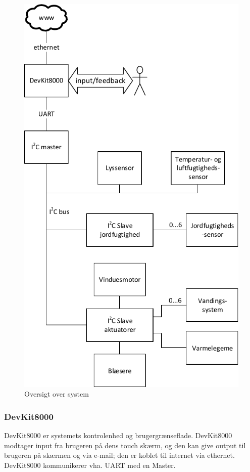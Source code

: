 \begin{figure}[!h]
\centering 
\includegraphics[height={\textheight - 2 cm}, trim=0 0 0 0, clip=true] {../fig/systemoversigt/sys_fig.pdf}
\caption{Oversigt over system}
\label{fig:systemoversigt}
\end{figure}

\clearpage

\subsubsection{DevKit8000}
DevKit8000 er systemets kontrolenhed og brugergrænseflade. 
DevKit8000 modtager input fra brugeren på dens touch skærm, og den kan give output til brugeren på skærmen og via e-mail; den er koblet til internet via ethernet. 
DevKit8000 kommunikerer vha. UART med en \IIC Master.
